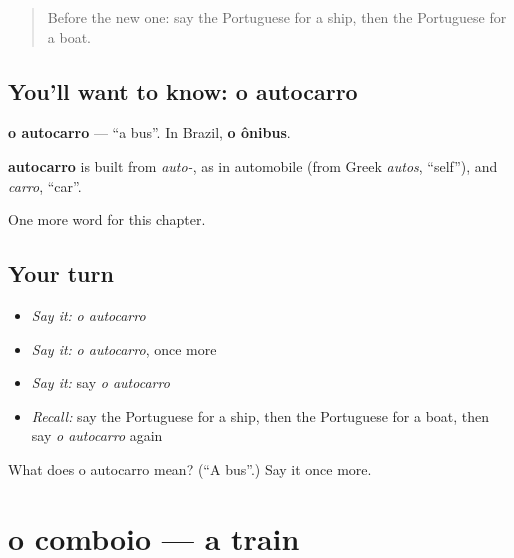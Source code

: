 \label{lesson:PT-C92-autocarro}



\begin{quote}
Before the new one: say the Portuguese for a ship, then the Portuguese for a boat.
\end{quote}

\subsection*{You'll want to know: o autocarro}
\textbf{o autocarro} — \textquotedblleft{}a bus\textquotedblright{}. In Brazil, \textbf{o ônibus}.

\begin{cousinweb}
\textbf{autocarro} is built from \emph{auto-}, as in automobile (from Greek \emph{autos}, \textquotedblleft{}self\textquotedblright{}), and \emph{carro}, \textquotedblleft{}car\textquotedblright{}.
\end{cousinweb}

\begin{grammarlens}[title={What you've built}]
One more word for this chapter.
\end{grammarlens}

\subsection*{Your turn}
\begin{itemize}
\raggedright
  \item \emph{Say it:} \emph{o autocarro}
  \item \emph{Say it:} \emph{o autocarro}, once more
  \item \emph{Say it:} say \emph{o autocarro}
  \item \emph{Recall:} say the Portuguese for a ship, then the Portuguese for a boat, then say \emph{o autocarro} again
\end{itemize}

\begin{tcolorbox}[breakable,colback=teal!4,colframe=teal!35!black,title={Before you move on}]
What does o autocarro mean? (\textquotedblleft{}A bus\textquotedblright{}.) Say it once more.
\end{tcolorbox}
\section[o comboio]{o comboio — a train}

\label{lesson:PT-C92-comboio}



